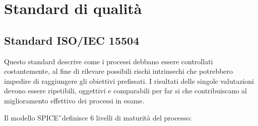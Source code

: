 \section{Standard di qualità}

\subsection{Standard ISO/IEC 15504}

Questo standard descrive come i processi debbano essere controllati costantemente, al fine di rilevare possibili rischi intrinsechi che potrebbero impedire di raggiungere gli obiettivi prefissati. I risultati delle singole valutazioni devono essere ripetibili, oggettivi e comparabili per far si che contribuiscano al miglioramento effettivo dei processi in esame. \newline

Il modello SPICE\G\ definisce 6 livelli di maturità del processo:

